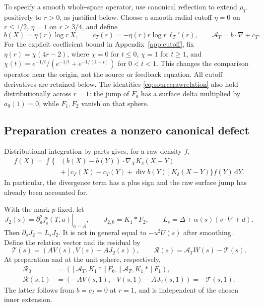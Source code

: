 \documentclass[11pt]{article}
\numberwithin{equation}{section}
\newcommand{\dd}{\,\mathrm d}
\begin{document}
To specify a smooth whole-space operator, use canonical reflection
to extend $\rho_T$ positively to $r>0$, as justified below.
Choose a smooth radial cutoff $\eta=0$ on $r\le1/2$, $\eta=1$ on
$r\ge3/4$, and define
\begin{equation}\label{eq:sourceextension}
 b(X)=\eta(r)\log r\,X,\qquad
 c_T(r)=-\eta(r)r\log r\,\ell_T'(r),\qquad
 \mathcal A_T=b\cdot\nabla+c_T.
\end{equation}
For the explicit coefficient bound in
Appendix~\ref{app:cutoff}, fix $\eta(r)=\chi(4r-2)$,
where $\chi=0$ for $t\le0$, $\chi=1$ for $t\ge1$, and
$\chi(t)=e^{-1/t}/(e^{-1/t}+e^{-1/(1-t)})$ for $0<t<1$.
This changes the comparison operator near the origin, not the source
or feedback equation. All cutoff derivatives are retained below.
The identities \eqref{eq:sourcerawrelation} also hold distributionally
across $r=1$: the jump of $F_0$ has a surface delta multiplied by
$a_0(1)=0$, while $F_1,F_2$ vanish on that sphere.

\subsection{Preparation creates a nonzero canonical defect}

Distributional integration by parts gives, for a raw density $f$,
\begin{align}
 [\mathcal A_T,K_\delta*]f(X)
 =\int\big\{&(b(X)-b(Y))\cdot\nabla_XK_\delta(X-Y)\nonumber\\
 &+[c_T(X)-c_T(Y)+\operatorname{div}b(Y)]
                      K_\delta(X-Y)\big\}f(Y)\dd Y.
 \label{eq:sourcepreparecommutator}
\end{align}
In particular, the divergence term has a plus sign and the raw
surface jump has already been accounted for.

With the mark $p$ fixed, let
\[
 J_2(s)=\left.\partial_a^2j_s^p(T,a)\right|_{a=A},\qquad
 J_{2,0}=K_1*F_2,
 \qquad L_s=\Delta+\alpha(s)(v\cdot\nabla+d).
\]
Then $\partial_sJ_2=L_sJ_2$. It is not in general equal to $-u^2U(s)$
after smoothing. Define the relation vector and its residual by
\begin{equation}\label{eq:sourceresidual}
 \mathcal T(s)=(AV(s),V(s)+AJ_2(s)),\qquad
 \mathcal R(s)=\mathcal A_TW(s)-\mathcal T(s).
\end{equation}
At preparation and at the unit sphere, respectively,
\begin{align}
 \mathcal R_0&=([\mathcal A_T,K_1*]F_0,
               [\mathcal A_T,K_1*]F_1),\label{eq:sourceinitialresidual}\\
 \mathcal R(s,1)&=(-AV(s,1),-V(s,1)-AJ_2(s,1))
                 =-\mathcal T(s,1).\label{eq:sourcespheretrace}
\end{align}
The latter follows from $b=c_T=0$ at $r=1$, and is independent of
the chosen inner extension.
\end{document}
